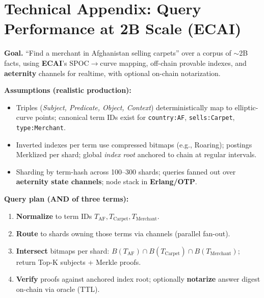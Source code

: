 \documentclass[11pt]{article}
\begin{document}
\section*{Technical Appendix: Query Performance at 2B Scale (ECAI)}

\textbf{Goal.} ``Find a merchant in Afghanistan selling carpets'' over a corpus of $\sim$2B facts, using \textbf{ECAI}'s SPOC$\rightarrow$curve mapping, off-chain provable indexes, and \textbf{aeternity} channels for realtime, with optional on-chain notarization.

\vspace{0.4em}
\textbf{Assumptions (realistic production):}
\begin{itemize}[leftmargin=*]
  \item Triples (\emph{Subject, Predicate, Object, Context}) deterministically map to elliptic-curve points; canonical term IDs exist for \texttt{country:AF}, \texttt{sells:Carpet}, \texttt{type:Merchant}.
  \item Inverted indexes per term use compressed bitmaps (e.g., Roaring); postings Merklized per shard; global \emph{index root} anchored to chain at regular intervals.
  \item Sharding by term-hash across 100--300 shards; queries fanned out over \textbf{aeternity state channels}; node stack in \textbf{Erlang/OTP}.
\end{itemize}

\textbf{Query plan (AND of three terms):}
\begin{enumerate}[leftmargin=*]
  \item \textbf{Normalize} to term IDs $T_{\mathrm{AF}},T_{\mathrm{Carpet}},T_{\mathrm{Merchant}}$.
  \item \textbf{Route} to shards owning those terms via channels (parallel fan-out).
  \item \textbf{Intersect} bitmaps per shard: $B(T_{\mathrm{AF}})\cap B(T_{\mathrm{Carpet}})\cap B(T_{\mathrm{Merchant}})$; return Top-K subjects + Merkle proofs.
  \item \textbf{Verify} proofs against anchored index root; optionally \textbf{notarize} answer digest on-chain via oracle (TTL).
\end{enumerate}
\end{document}

